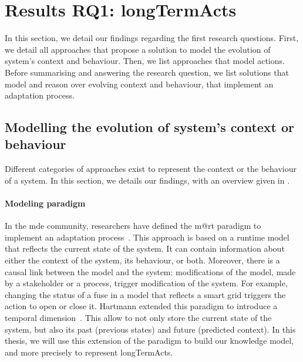 \section[Results RQ1: long-term actions]{Results RQ1: \glspl{longTermAct}}
\label{sec:sota:results:actions}

In this section, we detail our findings regarding the first research questions.
First, we detail all approaches that propose a solution to model the evolution of system's context and behaviour.
Then, we list approaches that model actions.
Before summarising and answering the research question, we list solutions that model and reason over evolving context and \gls{behaviour}, \ie that implement an adaptation process.

\subsection[Modelling the evolution of system's context or behaviour]{Modelling the evolution of system's context or \gls{behaviour}}

Different categories of approaches exist to represent the context or the \gls{behaviour} of a system.
In this section, we details our findings, with an overview given in .

\paragraph{Modeling paradigm}
In the \gls{mde} community, researchers have defined the \gls{m@rt} paradigm to implement an adaptation process~\cite{DBLP:journals/computer/BlairBF09, DBLP:journals/computer/MorinBJFS09}.
This approach is based on a runtime model that reflects the current state of the system.
It can contain information about either the context of the system, its \gls{behaviour}, or both.
Moreover, there is a causal link between the model and the system: modifications of the model, made by a stakeholder or a process, trigger modification of the system.
For example, changing the status of a fuse in a model that reflects a smart grid triggers the action to open or close it.
Hartmann \etal extended this paradigm to introduce a temporal dimension~\cite{DBLP:conf/seke/0001FNMKT14, DBLP:conf/models/0001FNMKBT14}.
This allow to not only store the current state of the system, but also its past (previous states) and future (predicted context).
In this thesis, we will use this extension of the paradigm to build our knowledge model, and more precisely to represent \glspl{longTermAct}.


